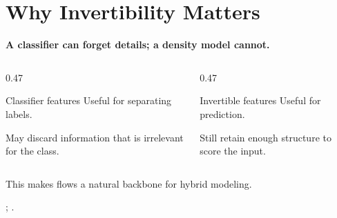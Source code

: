\documentclass[fleqn,compress,utf8,aspectratio=169,t]{beamer}
\makeatletter
\newcommand{\mainclaim}[1]{%
  {\Large\bfseries #1\par}
}
\newcommand{\quietsource}[1]{%
  \vfill{\scriptsize\color{lmu@lightgray}#1\par}
}
\makeatother
\begin{document}
\section{Why Invertibility Matters}
\begin{frame}
  \mainclaim{A classifier can forget details; a density model cannot.}

  \vspace{0.55cm}
  \begin{columns}[T,totalwidth=\textwidth]
    \begin{column}{0.47\textwidth}
      \begin{block}{Classifier features}
        Useful for separating labels.

        \vspace{0.25cm}
        May discard information that is irrelevant for the class.
      \end{block}
    \end{column}
    \begin{column}{0.47\textwidth}
      \begin{block}{Invertible features}
        Useful for prediction.

        \vspace{0.25cm}
        Still retain enough structure to score the input.
      \end{block}
    \end{column}
  \end{columns}

  \vspace{0.65cm}
  \centering
  This makes flows a natural backbone for hybrid modeling.

  \quietsource{\textcite{nalisnick2019hybrid}; \textcite{tomczak2024deep}.}
\end{frame}

\end{document}
